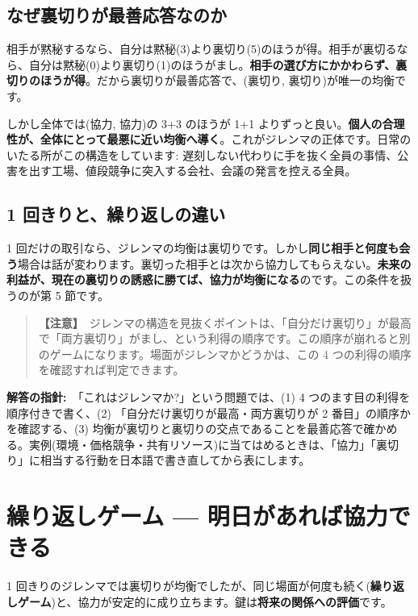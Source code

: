 \documentclass{article}
\begin{document}
\subsection{なぜ裏切りが最善応答なのか}

相手が黙秘するなら、自分は黙秘(3)より裏切り(5)のほうが得。相手が裏切るなら、自分は黙秘(0)より裏切り(1)のほうがまし。\textbf{相手の選び方にかかわらず、裏切りのほうが得}。だから裏切りが最善応答で、(裏切り, 裏切り)が唯一の均衡です。

しかし全体では(協力, 協力)の 3+3 のほうが 1+1 よりずっと良い。\textbf{個人の合理性が、全体にとって最悪に近い均衡へ導く}。これがジレンマの正体です。日常のいたる所がこの構造をしています: 遅刻しない代わりに手を抜く全員の事情、公害を出す工場、値段競争に突入する会社、会議の発言を控える全員。

\subsection{1 回きりと、繰り返しの違い}

1 回だけの取引なら、ジレンマの均衡は裏切りです。しかし\textbf{同じ相手と何度も会う}場合は話が変わります。裏切った相手とは次から協力してもらえない。\textbf{未来の利益が、現在の裏切りの誘惑に勝てば、協力が均衡になる}のです。この条件を扱うのが第 5 節です。

\begin{quote}
\textbf{【注意】}\ ジレンマの構造を見抜くポイントは、「自分だけ裏切り」が最高で「両方裏切り」がまし、という利得の順序です。この順序が崩れると別のゲームになります。場面がジレンマかどうかは、この 4 つの利得の順序を確認すれば判定できます。
\end{quote}

\textbf{解答の指針:}\ 「これはジレンマか?」という問題では、(1) 4 つのます目の利得を順序付きで書く、(2) 「自分だけ裏切りが最高・両方裏切りが 2 番目」の順序かを確認する、(3) 均衡が裏切りと裏切りの交点であることを最善応答で確かめる。実例(環境・価格競争・共有リソース)に当てはめるときは、「協力」「裏切り」に相当する行動を日本語で書き直してから表にします。

\section{繰り返しゲーム — 明日があれば協力できる}

1 回きりのジレンマでは裏切りが均衡でしたが、同じ場面が何度も続く(\textbf{繰り返しゲーム})と、協力が安定的に成り立ちます。鍵は\textbf{将来の関係への評価}です。
\end{document}
